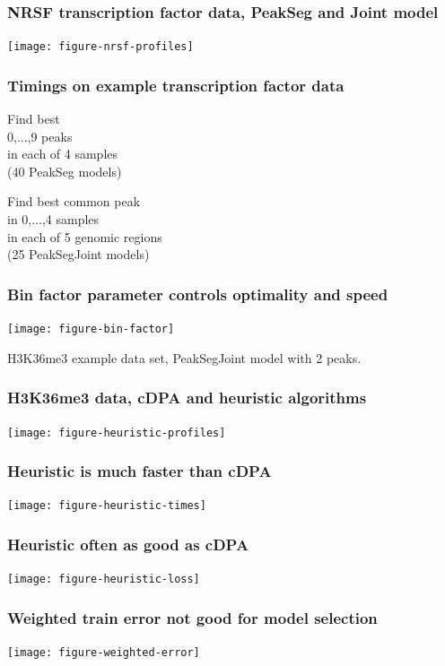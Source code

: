 \documentclass{beamer}
\begin{document}
\begin{frame}
  \frametitle{NRSF transcription factor data, PeakSeg and Joint model}

  \texttt{[image: figure-nrsf-profiles]}
\end{frame}

\begin{frame}
  \frametitle{Timings on example transcription factor data}

  \scriptsize

  Find best \\
  0,...,9 peaks\\
  in each of 4 samples\\
  (40 PeakSeg models)

  

  \vskip 0.2cm

  Find best common peak\\
  in 0,...,4 samples\\
  in each of 5 genomic regions\\
  (25 PeakSegJoint models)

  

\end{frame}

\begin{frame}
  \frametitle{Bin factor parameter controls optimality and speed}
  \texttt{[image: figure-bin-factor]}

  H3K36me3 example data set, PeakSegJoint model with 2 peaks.
\end{frame}

\begin{frame}
  \frametitle{H3K36me3 data, cDPA and heuristic algorithms}

  \texttt{[image: figure-heuristic-profiles]}
\end{frame}

\begin{frame}
  \frametitle{Heuristic is much faster than cDPA}

  \texttt{[image: figure-heuristic-times]}
\end{frame}

\begin{frame}
  \frametitle{Heuristic often as good as cDPA}

  \texttt{[image: figure-heuristic-loss]}
\end{frame}


\begin{frame}
  \frametitle{Weighted train error not good for model selection}

  \texttt{[image: figure-weighted-error]}
\end{frame}
\end{document}
